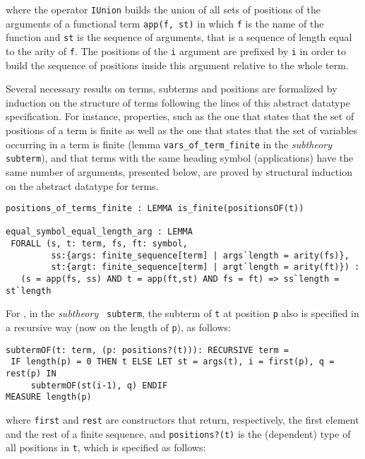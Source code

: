 \documentclass[submission,copyright,creativecommons]{eptcs}
\begin{document}
  \noindent where the operator {\tt IUnion} builds the union of all
  sets of positions of the arguments of a functional term {\tt app(f,
    st)} in which {\tt f} is the name of the function and {\tt st} is
  the sequence of arguments, that is a sequence of length equal to the
  arity of {\tt f}. The positions of the {\tt i} argument are
  prefixed by {\tt i} in order to build the sequence of positions
  inside this argument relative to the whole term.
 
  Several necessary results on terms, subterms and positions are
  formalized by induction on the structure of terms following the
  lines of this abstract datatype specification. For instance,
  properties, such as the one that states that the set of positions of
  a term is finite as well as the
  one that states that the set of variables occurring in a term is
   finite (lemma {\tt vars\_of\_term\_finite} in the
   \emph{subtheory} {\tt subterm}), and that terms with the same heading symbol
  (applications) have the same number of arguments, presented below,
  are proved by structural induction on the abstract datatype for
  terms.

  {\small
\begin{verbatim}
positions_of_terms_finite : LEMMA is_finite(positionsOF(t))

equal_symbol_equal_length_arg : LEMMA
 FORALL (s, t: term, fs, ft: symbol, 
         ss:{args: finite_sequence[term] | args`length = arity(fs)},
         st:{argt: finite_sequence[term] | argt`length = arity(ft)}) :
   (s = app(fs, ss) AND t = app(ft,st) AND fs = ft) => ss`length = st`length
\end{verbatim}
  }

  For , in the \emph{subtheory} {\tt
    subterm}, the subterm of {\tt t} at position {\tt p} also is
  specified in a recursive way (now on the length of {\tt p}), as
  follows:

  {\small
\begin{verbatim}
subtermOF(t: term, (p: positions?(t))): RECURSIVE term =
 IF length(p) = 0 THEN t ELSE LET st = args(t), i = first(p), q = rest(p) IN
     subtermOF(st(i-1), q) ENDIF
MEASURE length(p)
\end{verbatim}}

    \noindent where {\tt first} and {\tt rest} are constructors that
    return, respectively, the first element and the rest of a finite
    sequence, and {\tt positions?(t)} is the (dependent) type of all
    positions in {\tt t}, which is specified as follows:
\end{document}
